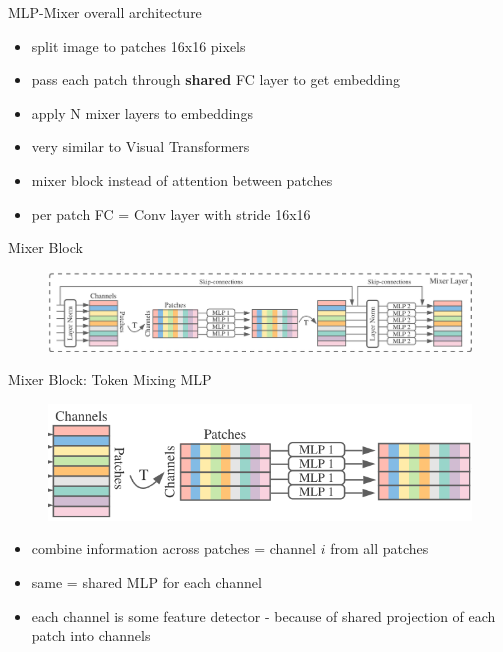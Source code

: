 \documentclass{beamer}
\begin{document}
\begin{frame}{MLP-Mixer overall architecture}

\begin{itemize}
\item split image to patches 16x16 pixels
\item pass each patch through \textbf{shared} FC layer to get embedding
\item apply N mixer layers to embeddings
\end{itemize}
\vfill

\begin{itemize}
\item very similar to Visual Transformers
\item mixer block instead of attention between patches
\item per patch FC = Conv layer with stride 16x16 
\end{itemize}
\end{frame}
\begin{frame}{Mixer Block}

\begin{figure}[h]
\includegraphics[width=\textwidth]{img/mixer}
\end{figure}

\end{frame}
\begin{frame}{Mixer Block: Token Mixing MLP}

\begin{figure}[h]
\includegraphics[width=\textwidth]{img/mlp1}
\end{figure}

\begin{itemize}
\item combine information across patches = channel $i$ from all patches
\item same = shared MLP for each channel
\item each channel is some feature detector - because of shared projection of each patch into channels
\end{itemize}

\end{frame}
\end{document}
